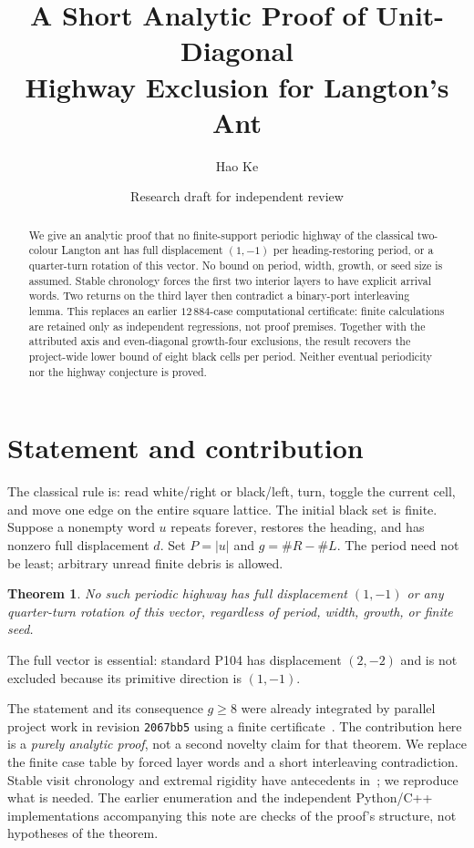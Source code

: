\documentclass[11pt]{article}
\title{A Short Analytic Proof of Unit-Diagonal\\Highway Exclusion for Langton's Ant}
\author{Hao Ke}
\date{Research draft for independent review}
\newtheorem{theorem}{Theorem}
\begin{document}
\maketitle
\begin{abstract}
We give an analytic proof that no finite-support periodic highway of the
classical two-colour Langton ant has full displacement $(1,-1)$ per
heading-restoring period, or a quarter-turn rotation of this vector. No bound
on period, width, growth, or seed size is assumed. Stable chronology forces
the first two interior layers to have explicit arrival words. Two returns
on the third layer then contradict a binary-port interleaving lemma. This
replaces an earlier $12\,884$-case computational certificate: finite
calculations are retained only as independent regressions, not proof premises.
Together with the attributed axis and even-diagonal growth-four exclusions,
the result recovers the project-wide lower bound of eight black cells per
period. Neither eventual periodicity nor the highway conjecture is proved.
\end{abstract}

\section{Statement and contribution}
The classical rule is: read white/right or black/left, turn, toggle the current
cell, and move one edge on the entire square lattice. The initial black set is
finite. Suppose a nonempty word $u$ repeats forever, restores the heading, and
has nonzero full displacement $d$. Set $P=|u|$ and $g=\#R-\#L$. The period
need not be least; arbitrary unread finite debris is allowed.

\begin{theorem}\label{thm:unit}
No such periodic highway has full displacement $(1,-1)$ or any quarter-turn
rotation of this vector, regardless of period, width, growth, or finite seed.
\end{theorem}
The full vector is essential: standard P104 has displacement $(2,-2)$ and is
not excluded because its primitive direction is $(1,-1)$.

The statement and its consequence $g\ge8$ were already integrated by parallel
project work in revision \texttt{2067bb5} using a finite certificate~\cite{C}.
The contribution here is a \emph{purely analytic proof}, not a second novelty
claim for that theorem. We replace the finite case table by forced layer words
and a short interleaving contradiction. Stable visit chronology and extremal
rigidity have antecedents in~\cite{J}; we reproduce what is needed. The earlier
enumeration and the independent Python/C++ implementations accompanying this
note are checks of the proof's structure, not hypotheses of the theorem.
\end{document}
